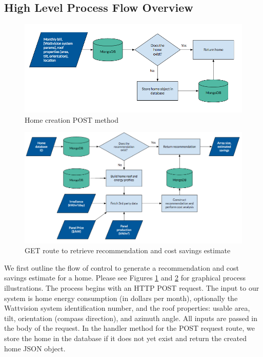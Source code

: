 \documentclass[pageno]{jpaper}
\begin{document}
\subsection{High Level Process Flow Overview}

\begin{figure}[h]
\begin{center}
\includegraphics[width= \textwidth]{POST}
\caption{Home creation POST method}
\label{fig:post}
\end{center}
\end{figure}

\begin{figure}[h]
\begin{center}
\includegraphics[width=\textwidth] {GET}
\caption{GET route to retrieve recommendation and cost savings estimate}
\label{fig:get}
\end{center}
\end{figure}

We first outline the flow of control to generate a recommendation and cost savings estimate for a home. Please see Figures \ref{fig:post} and \ref{fig:get} for graphical process illustrations. The process begins with an HTTP POST request. The input to our system is home energy consumption (in dollars per month), optionally the Wattvision system identification number, and the roof properties: usable area, tilt, orientation (compass direction), and azimuth angle. All inputs are passed in the body of the request. In the handler method for the POST request route, we store the home in the database if it does not yet exist and return the created home JSON object. 
\end{document}
